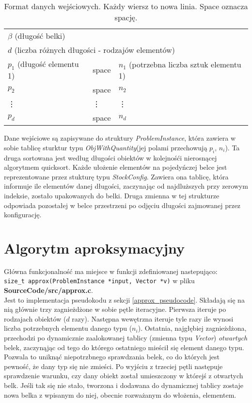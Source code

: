 \begin{table}[!h]
	\begin{center}
		\begin{tabular}{ p{5cm}p{2cm}p{7cm} }
			\multicolumn{3}{l}{$\beta$ (długość belki)} \\
			\multicolumn{3}{l}{$d$ (liczba różnych długości - rodzajów elementów)} \\
			$p_1$ (długość elementu 1) & space & $n_1$ (potrzebna liczba sztuk elementu 1)\\
			$p_2$ & space & $n_2$ \\
			\vdots & \vdots & \vdots \\
			$p_d$ & space & $n_d$ \\
		\end{tabular}
		\caption{Format danych wejściowych. Każdy wiersz to nowa linia. Space oznacza spację.}
	\end{center}
\end{table}
Dane wejściowe są zapisywane do struktury \textit{ProblemInstance}, która zawiera w sobie tablicę sturktur typu \textit{ObjWithQuantity}(jej polami przechowują $p_i$, $n_i$). Ta druga sortowana jest według długości obiektów w kolejnośći nierosnącej algorytmem quicksort.
Każde ułożenie elementów na pojedyńczej belce jest reprezentowane przez stukturę typu \textit{StockConfig}. Zawiera ona tablicę, która informuje ile elementów danej długości, zaczynając od najdluższych przy zerowym indeksie, zostało upakowanych do belki. Druga zmienna w tej strukturze odpowiada pozostałej w belce przestrzeni po odjęciu długości zajmowanej przez konfigurację.


\section{Algorytm aproksymacyjny}
Główna funkcjonalność ma miejsce w funkcji zdefiniowanej nastepująco: \\ \verb|size_t approx(ProblemInstance *input, Vector *v)| w pliku \textbf{SourceCode/src/approx.c}. \\
Jest to implementacja pseudokodu z sekcji \ref{approx_pseudocode}.
Składają się na nią głównie trzy zagnieżdżone w sobie pętle iteracyjne.
Pierwsza iteruje po rodzajach obiektów ($d$ razy).
Następna wewętrzna iteruje tyle razy ile wynosi liczba potrzebnych elementu danego typu ($n_i$).
Ostatnia, najgłębiej zagnieżdżona, przechodzi po dynamicznie zaalokowanej tablicy (zmienna typu \textit{Vector}) \textit{otwartych} belek, zaczynąjąc od tego do którego ostatniego mieścił się element danego typu. Pozwala to uniknąć niepotrzbnego sprawdzania belek, co do których jest pewność, że dany typ się nie zmieści. 
Po wyjściu z trzeciej pętli następuje sprawdzenie warunku, czy dany obiekt został umieszczony w którejś z otwartych belk. Jeśli tak się nie stało, tworzona i dodawana do dynamicznej tablicy zostaje nowa belka z wpisanym do niej, obecnie rozważanym do włożenia, elementem.

